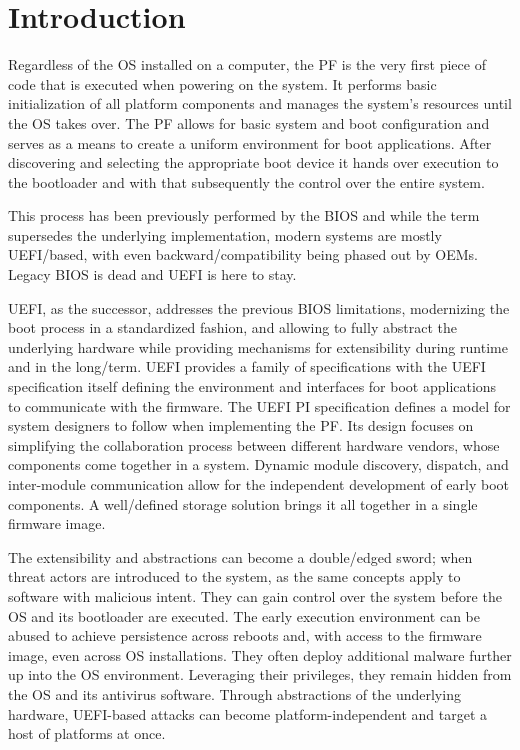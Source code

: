 

\chapter{Introduction}
\label{sec:introduction}

Regardless of the \ac{OS} installed on a computer, the \ac{PF} is the very first piece of code that is executed when powering on the system.
It performs basic initialization of all platform components and manages the system's resources until the \ac{OS} takes over.
The \ac{PF} allows for basic system and boot configuration and serves as a means to create a uniform environment for boot applications.
After discovering and selecting the appropriate boot device it hands over execution to the bootloader and with that subsequently the control over the entire system.

This process has been previously performed by the \ac{BIOS} and while the term supersedes the underlying implementation, modern systems are mostly \ac{UEFI}\-/based, with even backward\-/compatibility being phased out by \acp{OEM}.
Legacy \ac{BIOS} is dead and \ac{UEFI} is here to stay.

\ac{UEFI}, as the successor, addresses the previous \ac{BIOS} limitations, modernizing the boot process in a standardized fashion, and allowing to fully abstract the underlying hardware while providing mechanisms for extensibility during runtime and in the long\-/term.
\ac{UEFI} provides a family of specifications with the \ac{UEFI} specification itself defining the environment and interfaces for boot applications to communicate with the firmware.
The \ac{UEFI} \ac{PI} specification defines a model for system designers to follow when implementing the \ac{PF}.
Its design focuses on simplifying the collaboration process between different hardware vendors, whose components come together in a system.
Dynamic module discovery, dispatch, and inter-module communication allow for the independent development of early boot components.
A well\-/defined storage solution brings it all together in a single firmware image.

The extensibility and abstractions can become a double\-/edged sword; when threat actors are introduced to the system, as the same concepts apply to software with malicious intent.
They can gain control over the system before the \ac{OS} and its bootloader are executed.
The early execution environment can be abused to achieve persistence across reboots and, with access to the firmware image, even across \ac{OS} installations.
They often deploy additional malware further up into the \ac{OS} environment.
Leveraging their privileges, they remain hidden from the \ac{OS} and its antivirus software.
Through abstractions of the underlying hardware, \ac{UEFI}-based attacks can become platform-independent and target a host of platforms at once.

